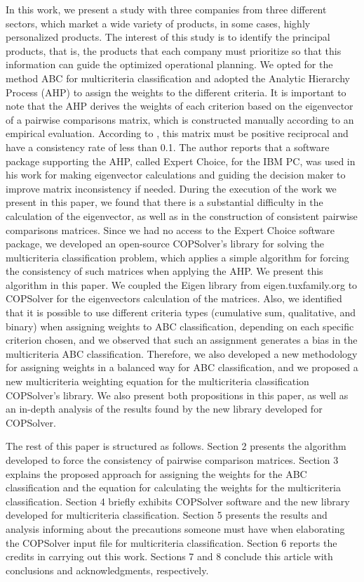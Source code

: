 \documentclass[10pt,fleqn,a4paper,twoside]{article}
\begin{document}
		In this work, we present a study with three companies from three different sectors, which market a wide variety of products, in some cases, highly personalized products. The interest of this study is to identify the principal products, that is, the products that each company must prioritize so that this information can guide the optimized operational planning. We opted for the method ABC for multicriteria classification and adopted the Analytic Hierarchy Process (AHP) \citep{Saaty1987} to assign the weights to the different criteria. It is important to note that the AHP derives the weights of each criterion based on the eigenvector of a pairwise comparisons matrix, which is constructed manually according to an empirical evaluation. According to \cite{Saaty1987}, this matrix must be positive reciprocal and have a consistency rate of less than 0.1.  The author reports that a software package supporting the AHP, called Expert Choice, for the IBM PC, was used in his work for making eigenvector calculations and guiding the decision maker to improve matrix inconsistency if needed. During the execution of the work we present in this paper, we found that there is a substantial difficulty in the calculation of the eigenvector, as well as in the construction of consistent pairwise comparisons matrices. Since we had no access to the Expert Choice software package, we developed an open-source COPSolver's library for solving the multicriteria classification problem, which applies a simple algorithm for forcing the consistency of such matrices when applying the AHP. We present this algorithm in this paper. We coupled the Eigen library from eigen.tuxfamily.org to COPSolver for the eigenvectors calculation of the matrices. Also, we identified that it is possible to use different criteria types (cumulative sum, qualitative, and binary) when assigning weights to ABC classification, depending on each specific criterion chosen, and we observed that such an assignment generates a bias in the multicriteria ABC classification. Therefore, we also developed a new methodology for assigning weights in a balanced way for ABC classification, and we proposed a new multicriteria weighting equation for the multicriteria classification COPSolver's library. We also present both propositions in this paper, as well as an in-depth analysis of the results found by the new library developed for COPSolver.
		
		The rest of this paper is structured as follows. Section 2 presents the algorithm developed to force the consistency of pairwise comparison matrices. Section 3 explains the proposed approach for assigning the weights for the ABC classification and the equation for calculating the weights for the multicriteria classification. Section 4 briefly exhibits COPSolver software and the new library developed for multicriteria classification. Section 5 presents the results and analysis informing about the precautions someone must have when elaborating the COPSolver input file for multicriteria classification. Section 6 reports the credits in carrying out this work. Sections 7 and 8 conclude this article with conclusions and acknowledgments, respectively.
    
\end{document}
